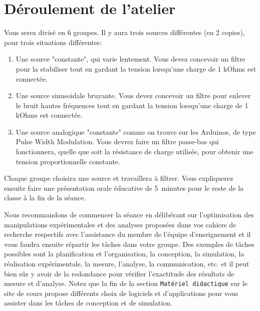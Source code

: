 \documentclass[canadien,12pt,oneside,letterpaper]{article}
\begin{document}

\section{Déroulement de l’atelier}

Vous serez divisé en 6 groupes. Il y aura trois sources différentes (en 2 copies), pour trois situations différentes:
\begin{enumerate}
\item Une source "constante", qui varie lentement. Vous devez concevoir un filtre pour la stabiliser tout en gardant la tension lorsqu'une charge de 1 kOhms  est connectée.
\item Une source sinusoidale bruyante. Vous devez concevoir un filtre pour enlever le bruit hautes fréquences tout en gardant la tension lorsqu'une charge de 1 kOhms est connectée.
\item Une source analogique "constante" comme on trouve sur les Arduinos, de type Pulse Width Modulation. Vous devrez faire un filtre passe-bas qui fonctionnera, quelle que soit la résistance de charge utilisée, pour obtenir une tension proportionnelle constante.
\end{enumerate}

Chaque groupe choisira une source et travaillera à filtrer. Vous expliquerez ensuite faire une présentation orale éducative de 5~minutes pour le reste de la classe à la fin de la séance. 

Nous recommandons de commencer la séance en délibérant sur l'optimisation des manipulations expérimentales et des analyses proposées dans vos cahiers de recherche respectifs avec l'assistance du membre de l'équipe d'enseignement et il vous faudra ensuite répartir les tâches dans votre groupe. Des exemples de tâches possibles sont la planification et l'organisation, la conception, la simulation, la réalisation expérimentale, la mesure, l'analyse, la communication, etc. et il peut bien sûr y avoir de la redondance pour vérifier l'exactitude des résultats de mesure et d'analyse. Notez que la fin de la section \texttt{Matériel didactique} sur le site de cours propose différents choix de logiciels et d'applications pour vous assister dans les tâches de conception et de simulation.
\end{document}
